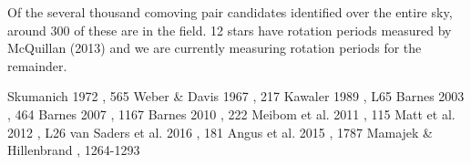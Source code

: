 Of the several thousand comoving pair candidates identified over the entire
sky, around 300 of these are in the \kepler field.
12 stars have rotation periods measured by McQuillan (2013) and we are
currently measuring rotation periods for the remainder.


\begin{references}
 Skumanich 1972 , 565
 Weber \& Davis 1967 , 217
 Kawaler 1989 , L65
 Barnes 2003 , 464
 Barnes 2007 , 1167
 Barnes 2010 , 222
 Meibom et al. 2011 , 115
 Matt et al. 2012 , L26
 van Saders et al. 2016 , 181
 Angus et al. 2015 , 1787
 Mamajek \& Hillenbrand , 1264-1293
\end{references}

%
%

